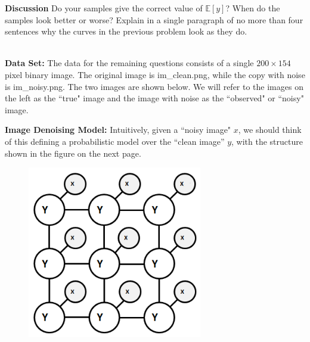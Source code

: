 \documentclass[11pt]{article}
\begin{document}
\begin{problem}{5} \textbf{Discussion}
Do your samples give the correct value of $\mathbb{E}[y]$? When do the samples look better or worse? Explain in a single paragraph of no more than four sentences why the curves in the previous problem look as they do.
\end{problem}
\\

\textbf{Data Set:} The data for the remaining questions consists of a single $200 \times 154$ pixel binary image.  The original image is {\asciifamily im\_clean.png}, while the copy with noise is {\asciifamily im\_noisy.png}.
The two images are shown below. We will refer to the images on the left as the ``true" image and the image with noise as the ``observed" or ``noisy" image.

\begin{figure}[ht]
\centering
{}
\label{fig:faces}
\end{figure}



\textbf{Image Denoising Model: } Intuitively, given a ``noisy image" $x$, we should think of this defining a probabilistic model over the ``clean image'' $y$, with the structure shown in the figure on the next page.

\begin{figure}[ht]
\centering
   \includegraphics[width=3in] {Figures/grid-crf.png}
\label{fig:crf}
\end{figure}
\end{document}

